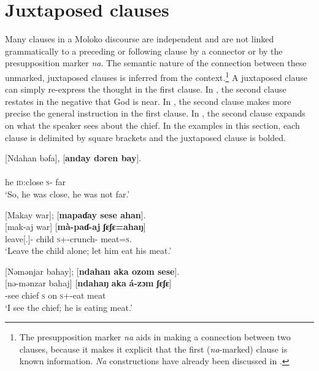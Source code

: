 \section{Juxtaposed clauses}\label{sec:12.4}
\hypertarget{RefHeading1213521525720847}{}
Many clauses in a Moloko discourse are independent and are not linked grammatically to a preceding or following clause by a connector or by the presupposition marker \textit{na}. The semantic nature of the connection between these unmarked, \nohyphens{juxtaposed} clauses is inferred from the context.\footnote{The presupposition marker \textit{na} aids in making a connection between two clauses, because it makes it explicit that the first (\textit{na}{}-marked) clause is known information. \textit{Na} constructions have already been discussed in .}  A juxtaposed clause can simply re-express the thought in the first clause. In , the second clause restates in the negative that God is near. In , the second clause makes more precise the general instruction in the first clause. In , the second clause expands on what the speaker sees about the chief. In the examples in this section, each clause is delimited by square brackets and the juxtaposed clause is bolded.

\ea \label{ex:12:62}
{}[Ndahan  bəfa],  [\textbf{anday  dəren  bay}]. \\
\\
      he  \textsc{id}:close   {\textsc{s}-{\PROG}}  far  {\NEG}\\
\glt  ‘So, he was close, he was not far.’
\z 

\ea \label{ex:12:63}
{}[Makay  war];  [\textbf{mapaɗay  sese  ahan}].\\
\gll  {}[mak-aj war] [\textbf{mà-paɗ-aj}     \textbf{ʃɛʃɛ=ahaŋ}]\\
      leave[{\twoS}.{\IMP}]-{\CL}  {child}  \textsc{s}+{\HOR}-crunch-{\CL}  {meat}=\textsc{s}.{\POSS}\\
\glt  ‘Leave the child alone; let him eat his meat.’ 
\z 

\clearpage
\ea \label{ex:12:64}
{}[Nəmənjar  bahay];  [\textbf{ndahan  aka  ozom  sese}].\\
\gll  {}[nə-mənzar bahaj]  [\textbf{ndahaŋ} \textbf{aka} \textbf{á-zɔm} \textbf{ʃɛʃɛ}]\\
      {\oneS}-see  chief  \textsc{s}  on  \textsc{s}+{\IFV}-eat  meat\\
\glt  ‘I see the chief; he is eating meat.’ 
\z 

